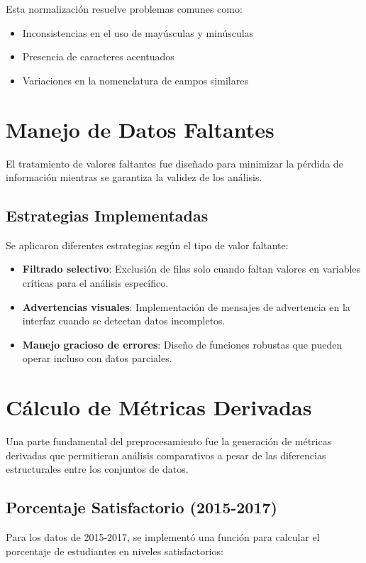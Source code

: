 Esta normalización resuelve problemas comunes como:
\begin{itemize}
    \item Inconsistencias en el uso de mayúsculas y minúsculas
    \item Presencia de caracteres acentuados
    \item Variaciones en la nomenclatura de campos similares
\end{itemize}

\section{Manejo de Datos Faltantes}
El tratamiento de valores faltantes fue diseñado para minimizar la pérdida de información mientras se garantiza la validez de los análisis.

\subsection{Estrategias Implementadas}
Se aplicaron diferentes estrategias según el tipo de valor faltante:

\begin{itemize}
    \item \textbf{Filtrado selectivo}: Exclusión de filas solo cuando faltan valores en variables críticas para el análisis específico.
    \item \textbf{Advertencias visuales}: Implementación de mensajes de advertencia en la interfaz cuando se detectan datos incompletos.
    \item \textbf{Manejo gracioso de errores}: Diseño de funciones robustas que pueden operar incluso con datos parciales.
\end{itemize}

\section{Cálculo de Métricas Derivadas}
Una parte fundamental del preprocesamiento fue la generación de métricas derivadas que permitieran análisis comparativos a pesar de las diferencias estructurales entre los conjuntos de datos.

\subsection{Porcentaje Satisfactorio (2015-2017)}
Para los datos de 2015-2017, se implementó una función para calcular el porcentaje de estudiantes en niveles satisfactorios:

